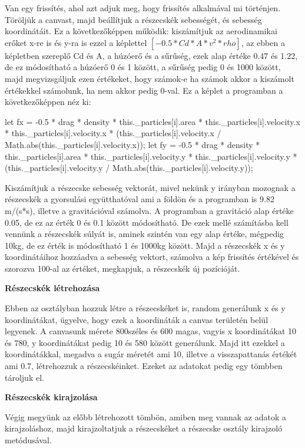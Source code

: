Van egy frissítés, ahol azt adjuk meg, hogy frissítés alkalmával mi történjen. Töröljük a canvast, majd beállítjuk a részecskék sebességét, és sebesség koordinátáit. Ez a következőképpen működik: kiszámítjuk az aerodinamikai erőket x-re is és y-ra is ezzel a képlettel $[-0.5 * Cd * A * v^2 * rho]$, az ebben a képletben szereplő Cd és A, a húzóerő és a sűrűség, ezek alap értéke 0.47 és 1.22, de ez módosítható a húzóerő 0 és 1 között, a sűrűség pedig 0 és 1000 között, majd megvizsgáljuk ezen értékeket, hogy számok-e ha számok akkor a kiszámolt értékekkel számolunk, ha nem akkor pedig 0-val. Ez a képlet a programban a következőképpen néz ki:
\begin{java}
	let fx = -0.5 * drag * density *
	 this._particles[i].area *
	  this._particles[i].velocity.x *
	   this._particles[i].velocity.x *
	    (this._particles[i].velocity.x /
	     Math.abs(this._particles[i].velocity.x));
	let fy = -0.5 * drag * density *
	 this._particles[i].area *
	  this._particles[i].velocity.y *
	   this._particles[i].velocity.y *
	    (this._particles[i].velocity.y /
	     Math.abs(this._particles[i].velocity.y));
\end{java}
Kiszámítjuk a részecske sebesség vektorát, mivel nekünk y irányban mozognak a részecskék a gyorsulási együtthatóval ami a földön és a programban is 9.82 m/(s*s), illetve a gravitációval számolva. A programban a gravitáció alap értéke 0.05, de ez az érték 0 és 0.1 között módosítható. De ezek mellé számításba kell vennünk a részecskék súlyát is, aminek szintén van egy alap értéke, mégpedig 10kg, de ez érték is módosítható 1 és 1000kg között. Majd a részecskék x és y koordinátáihoz hozzáadva a sebesség vektort, számolva a kép frissítés értékével és szorozva 100-al az értéket, megkapjuk, a részecskék új pozícióját.

\textbf{Részecskék létrehozása}

Ebben az osztályban hozzuk létre a részecskéket is, random generálunk x és y koordinátákat, ügyelve, hogy ezek a koordináták a canvas területén belül legyenek. A canvasunk mérete 800széles és 600 magas, vagyis x koordinátákat 10 és 780, y koordinátákat pedig 10 és 580 között generálunk. Majd itt ezekkel a koordinátákkal, megadva a sugár méretét ami 10, illetve a visszapattanás értékét ami 0.7, létrehozzuk a részecskéinket. Ezeket az adatokat pedig egy tömbben tároljuk el. 

\textbf{Részecskék kirajzolása}


Végig megyünk az előbb létrehozott tömbön, amiben meg vannak az adatok a kirajzoláshoz, majd kirajzoltatjuk a részecskéket a részecske osztály kirajzoló metódusával. 


